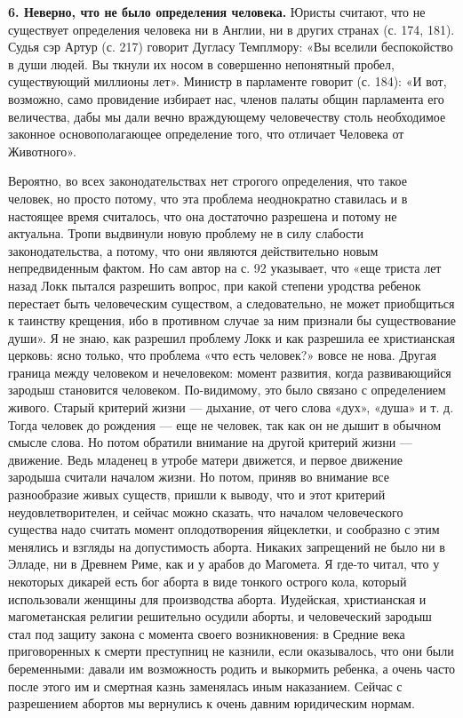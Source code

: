 \textbf{6. Неверно, что не было определения человека.} Юристы считают,
что  не существует  определения  человека  ни в  Англии,  ни в  других
странах  (с. 174,  181).  Судья  сэр Артур  (с.  217) говорит  Дугласу
Темплмору: «Вы вселили беспокойство в души людей. Вы ткнули их носом в
совершенно непонятный  пробел, существующий  миллионы лет».  Министр в
парламенте  говорит  (с.  184):  «И  вот,  возможно,  само  провидение
избирает  нас, членов  палаты  общин парламента  его величества,  дабы
мы  дали вечно  враждующему  человечеству  столь необходимое  законное
основополагающее   определение   того,   что  отличает   Человека   от
Животного».

Вероятно,  во всех  законодательствах  нет  строгого определения,  что
такое  человек,  но  просто  потому,  что  эта  проблема  неоднократно
ставилась и в настоящее время  считалось, что она достаточно разрешена
и  потому не  актуальна.  Тропи  выдвинули новую  проблему  не в  силу
слабости законодательства,  а потому,  что они  являются действительно
новым  непредвиденным фактом.  Но сам  автор на  с. 92  указывает, что
«еще  триста  лет  назад  Локк пытался  разрешить  вопрос,  при  какой
степени  уродства ребенок  перестает  быть  человеческим существом,  а
следовательно,  не  может  приобщиться  к  таинству  крещения,  ибо  в
противном  случае  за  ним  признали  бы  существование  души».  Я  не
знаю,  как разрешил  проблему  Локк и  как  разрешила ее  христианская
церковь: ясно только, что проблема  «что есть человек?» вовсе не нова.
Другая граница  между человеком и нечеловеком:  момент развития, когда
развивающийся  зародыш  становится  человеком. По-видимому,  это  было
связано с определением  живого. Старый критерий жизни  --- дыхание, от
чего слова «дух», «душа» и т. д.  Тогда человек до рождения --- еще не
человек, так как он не дышит в обычном смысле слова. Но потом обратили
внимание на другой критерий жизни --- движение. Ведь младенец в утробе
матери движется, и первое движение  зародыша считали началом жизни. Но
потом, приняв  во внимание  все разнообразие  живых существ,  пришли к
выводу,  что  и  этот  критерий  неудовлетворителен,  и  сейчас  можно
сказать,  что  началом  человеческого  существа  надо  считать  момент
оплодотворения яйцеклетки,  и сообразно с  этим менялись и  взгляды на
допустимость  аборта. Никаких  запрещений не  было ни  в Элладе,  ни в
Древнем  Риме, как  и у  арабов  до Магомета.  Я где-то  читал, что  у
некоторых дикарей есть бог аборта в виде тонкого острого кола, который
использовали женщины для  производства аборта. Иудейская, христианская
и  магометанская религии  решительно  осудили  аборты, и  человеческий
зародыш  стал под  защиту  закона с  момента  своего возникновения:  в
Средние  века  приговоренных  к  смерти преступниц  не  казнили,  если
оказывалось, что они были беременными:  давали им возможность родить и
выкормить  ребенка, а  очень часто  после  этого им  и смертная  казнь
заменялась иным наказанием. Сейчас  с разрешением абортов мы вернулись
к очень давним юридическим нормам.

